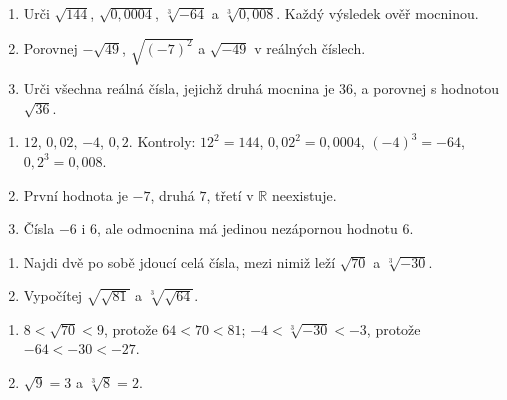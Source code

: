 \documentclass[11pt,a4paper]{article}
\begin{document}



\begin{zadaniReseniBox}[title={Základ: hodnota odmocniny a kontrola},breakable=false]
\begin{enumerate}[label=\alph*)]
\item Urči $\sqrt{144}$, $\sqrt{0{,}0004}$, $\sqrt[3]{-64}$ a $\sqrt[3]{0{,}008}$. Každý výsledek ověř mocninou.
\item Porovnej $-\sqrt{49}$, $\sqrt{(-7)^2}$ a $\sqrt{-49}$ v reálných číslech.
\item Urči všechna reálná čísla, jejichž druhá mocnina je $36$, a porovnej s hodnotou $\sqrt{36}$.
\end{enumerate}
\tcblower
\begin{enumerate}[label=\alph*)]
\item $12$, $0{,}02$, $-4$, $0{,}2$. Kontroly: $12^2=144$, $0{,}02^2=0{,}0004$, $(-4)^3=-64$, $0{,}2^3=0{,}008$.
\item První hodnota je $-7$, druhá $7$, třetí v $\mathbb R$ neexistuje.
\item Čísla $-6$ i $6$, ale odmocnina má jedinou nezápornou hodnotu $6$.
\end{enumerate}
\end{zadaniReseniBox}

\begin{zadaniReseniBox}[title={Rezerva: odhad a vnořené odmocniny},breakable=false]
\begin{enumerate}[label=\alph*)]
\item Najdi dvě po sobě jdoucí celá čísla, mezi nimiž leží $\sqrt{70}$ a $\sqrt[3]{-30}$.
\item Vypočítej $\sqrt{\sqrt{81}}$ a $\sqrt[3]{\sqrt{64}}$.
\end{enumerate}
\tcblower
\begin{enumerate}[label=\alph*)]
\item $8<\sqrt{70}<9$, protože $64<70<81$; $-4<\sqrt[3]{-30}<-3$, protože $-64<-30<-27$.
\item $\sqrt9=3$ a $\sqrt[3]8=2$.
\end{enumerate}
\end{zadaniReseniBox}


\end{document}
